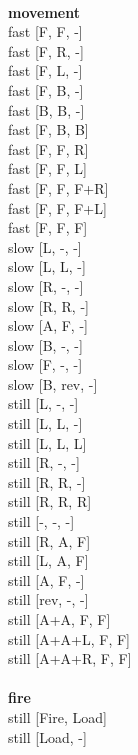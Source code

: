 \ \\ {\bf movement } \\
fast [F, F, -] \\
fast [F, R, -] \\
fast [F, L, -] \\
fast [F, B, -] \\
fast [B, B, -] \\
fast [F, B, B] \\
fast [F, F, R] \\
fast [F, F, L] \\
fast [F, F, F+R] \\
fast [F, F, F+L] \\
fast [F, F, F] \\
slow [L, -, -] \\
slow [L, L, -] \\
slow [R, -, -] \\
slow [R, R, -] \\
slow [A, F, -] \\
slow [B, -, -] \\
slow [F, -, -] \\
slow [B, rev, -] \\
still [L, -, -] \\
still [L, L, -] \\
still [L, L, L] \\
still [R, -, -] \\
still [R, R, -] \\
still [R, R, R] \\
still [-, -, -] \\
still [R, A, F] \\
still [L, A, F] \\
still [A, F, -] \\
still [rev, -, -] \\
still [A+A, F, F] \\
still [A+A+L, F, F] \\
still [A+A+R, F, F] \\
\ \\ {\bf fire } \\
still [Fire, Load] \\
still [Load, -] \\


